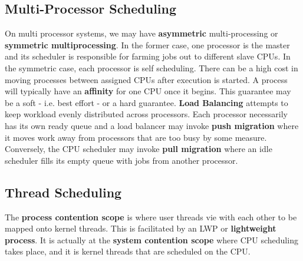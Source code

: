 \documentclass[10pt,a4paper]{article}
\begin{document}
\begin{itemize}
\subsection{Multi-Processor Scheduling}
On multi processor systems, we may have {\bf asymmetric} multi-processing or {\bf symmetric multiprocessing}. In the former case, one processor is the master and its scheduler is responsible for farming jobs out to different slave CPUs. In the symmetric case, each processor is self scheduling. There can be a high cost in moving processes between assigned CPUs after execution is started. A process will typically have an {\bf affinity} for one CPU once it begins. This guarantee may be a soft - i.e. best effort - or a hard guarantee. 
\newline\newline
{\bf Load Balancing} attempts to keep workload evenly distributed across processors. Each processor necessarily has its own ready queue and a load balancer may invoke {\bf push migration} where it moves work away from processors that are too busy by some measure. Conversely, the CPU scheduler may invoke {\bf pull migration} where an idle scheduler fills its empty queue with jobs from another processor.
\subsection{Thread Scheduling}
The {\bf process contention scope} is where user threads vie with each other to be mapped onto kernel threads. This is facilitated by an LWP or {\bf lightweight process}. It is actually at the {\bf system contention scope} where CPU scheduling takes place, and it is kernel threads that are  scheduled on the CPU. 

\end{itemize}
\end{document}
